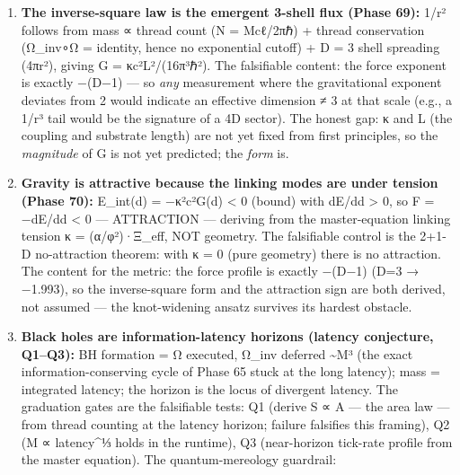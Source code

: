 \documentclass[
]{article}
\begin{document}
\begin{enumerate}
  each additional level is suppressed by 1/φ² (Phase 66's ψ²), and level
  4 is topologically unstable (knot stability collapses 0.044 → 0.006;
  knots unknot in 4D). The falsifiable content: any substrate model that
  stacks to 4 or higher dimensions (or any measurement indicating an
  effective dimension \textgreater{} \textasciitilde3.24 at the stacking
  scale) would falsify the stopping rule. This also selects the P3′
  locus reading (observer-relative, no global axis) over the naive-axis
  reading, which overshoots to 2N.
\item
  \textbf{The inverse-square law is the emergent 3-shell flux (Phase
  69):} 1/r² follows from mass ∝ thread count (N = Mcℓ/2πℏ) + thread
  conservation (Ω\_inv∘Ω = identity, hence no exponential cutoff) + D =
  3 shell spreading (4πr²), giving G = κc²L²/(16π³ℏ²). The falsifiable
  content: the force exponent is exactly −(D−1) --- so \emph{any}
  measurement where the gravitational exponent deviates from 2 would
  indicate an effective dimension ≠ 3 at that scale (e.g., a 1/r³ tail
  would be the signature of a 4D sector). The honest gap: κ and L (the
  coupling and substrate length) are not yet fixed from first
  principles, so the \emph{magnitude} of G is not yet predicted; the
  \emph{form} is.
\item
  \textbf{Gravity is attractive because the linking modes are under
  tension (Phase 70):} E\_int(d) = −κ²c²G(d) \textless{} 0 (bound) with
  dE/dd \textgreater{} 0, so F = −dE/dd \textless{} 0 --- ATTRACTION ---
  deriving from the master-equation linking tension κ = (α/φ²)·Ξ\_eff,
  NOT geometry. The falsifiable control is the 2+1-D no-attraction
  theorem: with κ = 0 (pure geometry) there is no attraction. The
  content for the metric: the force profile is exactly −(D−1) (D=3 →
  −1.993), so the inverse-square form and the attraction sign are both
  derived, not assumed --- the knot-widening ansatz survives its hardest
  obstacle.
\item
  \textbf{Black holes are information-latency horizons (latency
  conjecture, Q1--Q3):} BH formation = Ω executed, Ω\_inv deferred
  \textasciitilde M³ (the exact information-conserving cycle of Phase 65
  stuck at the long latency); mass = integrated latency; the horizon is
  the locus of divergent latency. The graduation gates are the
  falsifiable tests: Q1 (derive S ∝ A --- the area law --- from thread
  counting at the latency horizon; failure falsifies this framing), Q2
  (M ∝ latency\^{}⅓ holds in the runtime), Q3 (near-horizon tick-rate
  profile from the master equation). The quantum-mereology guardrail:

\end{enumerate}
\end{document}
